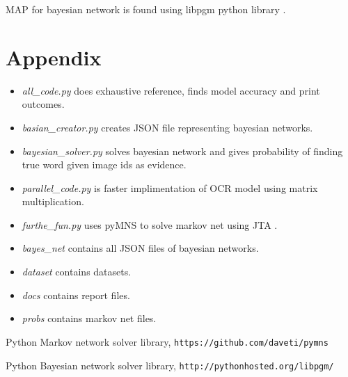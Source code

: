 \documentclass[paper=a4, fontsize=11pt]{scrartcl} %
\numberwithin{equation}{section} %
\numberwithin{figure}{section} %
\numberwithin{table}{section} %
\begin{document}
MAP for bayesian network is found using libpgm python library \cite{libpgm}.

\section{Appendix}

\begin{itemize}
  \item \textit{all\_code.py} does exhaustive reference, finds model accuracy and print outcomes.
  \item \textit{basian\_creator.py} creates JSON file representing bayesian networks.
  \item \textit{bayesian\_solver.py} solves bayesian network and gives probability of finding true word given image ids as evidence.
  \item \textit{parallel\_code.py} is faster implimentation of OCR model using matrix multiplication.
  \item \textit{furthe\_fun.py} uses pyMNS to solve markov net using JTA \cite{pymns}.
  \item \textit{bayes\_net} contains all JSON files of bayesian networks.
  \item \textit{dataset} contains datasets.
  \item \textit{docs} contains report files.
  \item \textit{probs} contains markov net files.
\end{itemize}


\begin{thebibliography}{9}
Python Markov network solver library,
\texttt{https://github.com/daveti/pymns}

Python Bayesian network solver library,
\texttt{http://pythonhosted.org/libpgm/}

\end{thebibliography}
\end{document}
